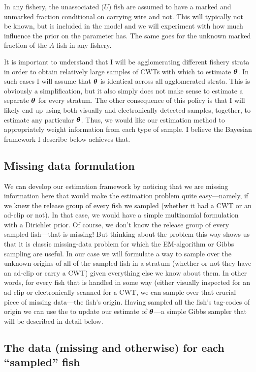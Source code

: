\documentclass[11pt]{article}
\def\bm#1{\mathpalette\bmstyle{#1}}
\def\bmstyle#1#2{\mbox{\boldmath$#1#2$}}
\newcommand{\btheta}{\bm{\theta}}
\begin{document}
In any fishery, the unassociated ($U$) fish are assumed to have a marked and unmarked fraction conditional
on carrying wire and not.  This will typically not be known, but is included in the model and we will
experiment with how much influence the prior on the parameter has.  The same goes for the unknown marked
fraction of the $A$ fish in any fishery.

It is important to understand that I will be agglomerating different fishery strata in order to obtain
relatively large samples of CWTs with which to estimate $\btheta$.  In such cases I will assume that
$\btheta$ is identical across all agglomerated strata.  This is obviously a simplification, but it also
simply does not make sense to estimate a separate $\btheta$ for every stratum.  The other consequence
of this policy is that I will likely end up using both visually and electronically detected samples, together, to estimate any particular $\btheta$.  Thus, we would like our estimation method to
appropriately weight information from each type of sample.  I believe the Bayesian framework I
describe below achieves that.

\subsection{Missing data formulation}
We can develop our estimation framework by noticing that we are missing information here
that would make the estimation problem quite easy---namely, if we knew the release group of every
fish we sampled (whether it had a CWT or an ad-clip or not).  In that case, we would have a simple multinomial
formulation with a Dirichlet prior.  Of course, we don't know the release group of every sampled
fish---that is missing!  But thinking about the problem this way shows us that it is classic
missing-data problem for which the EM-algorithm or Gibbs sampling are useful.  In our case we will
formulate a way to sample over the unknown origins of all of the sampled fish in a stratum (whether or 
not they have an ad-clip or carry a CWT) given 
everything else we know about them.
In other words, for every fish that is handled in some way (either visually inspected for an ad-clip or
electronically scanned for a CWT, we can sample over that crucial piece of missing data---the fish's origin.
Having sampled all the fish's tag-codes of origin we can use the to update our estimate of
$\btheta$---a simple Gibbs sampler that will be described in detail below.

\subsection{The data (missing and otherwise) for each ``sampled'' fish}
\end{document}
